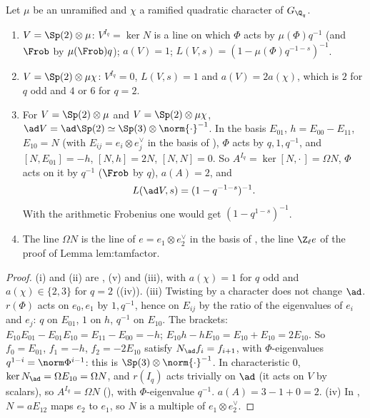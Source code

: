 \begin{proposition}\label{prop:local:steinberg-shape}
Let $\mu$ be an unramified and $\chi$ a ramified quadratic character of $G_{\Q_q}$.
\begin{enumerate}[label=(\roman*)]
\item $V=\Sp(2)\otimes\mu$: $V^{I_q}=\ker N$ is a line on which $\Phi$ acts by $\mu(\Phi)q^{-1}$ (and $\Frob$ by $\mu(\Frob)q$); $a(V)=1$; $L(V,s)=(1-\mu(\Phi)q^{-1-s})^{-1}$.
\item $V=\Sp(2)\otimes\mu\chi$: $V^{I_q}=0$, $L(V,s)=1$ and $a(V)=2a(\chi)$, which is $2$ for $q$ odd and $4$ or $6$ for $q=2$.
\item For $V=\Sp(2)\otimes\mu$ and $V=\Sp(2)\otimes\mu\chi$, $\ad V=\ad\Sp(2)\simeq\Sp(3)\otimes\norm{\cdot}^{-1}$. In the basis $E_{01}$, $h=E_{00}-E_{11}$, $E_{10}=N$ (with
$E_{ij}=e_i\otimes e_j^\vee$ in the basis of ), $\Phi$ acts by $q,1,q^{-1}$, and $[N,E_{01}]=-h$, $[N,h]=2N$, $[N,N]=0$. So $A^{I_q}=\ker[N,\cdot\,]=\Omega N$, $\Phi$ acts on it
by $q^{-1}$ ($\Frob$ by $q$), $a(A)=2$, and
\[
L(\ad V,s)=(1-q^{-1-s})^{-1}.
\]
With the arithmetic Frobenius one would get $(1-q^{1-s})^{-1}$.
\item The line $\Omega N$ is the line of $e=e_1\otimes e_2^\vee$ in the basis of , the line $\Z_\ell e$ of the proof of Lemma lem:tamfactor.
\end{enumerate}
\end{proposition}

\begin{proof}
(i) and (ii) are , (v) and (iii), with $a(\chi)=1$ for $q$ odd and $a(\chi)\in\{2,3\}$ for $q=2$
((iv)). (iii) Twisting by a character does not change $\ad$. $r(\Phi)$ acts on $e_0,e_1$ by $1,q^{-1}$, hence on $E_{ij}$ by the ratio of the eigenvalues
of $e_i$ and $e_j$: $q$ on $E_{01}$, $1$ on $h$, $q^{-1}$ on $E_{10}$. The brackets: $E_{10}E_{01}-E_{01}E_{10}=E_{11}-E_{00}=-h$; $E_{10}h-hE_{10}=E_{10}+E_{10}=2E_{10}$. So
$f_0=E_{01}$, $f_1=-h$, $f_2=-2E_{10}$ satisfy $N_{\ad}f_i=f_{i+1}$, with $\Phi$-eigenvalues $q^{1-i}=\norm\Phi^{i-1}$: this is $\Sp(3)\otimes\norm{\cdot}^{-1}$. In characteristic $0$,
$\ker N_{\ad}=\Omega E_{10}=\Omega N$, and $r(I_q)$ acts trivially on $\ad$ (it acts on $V$ by scalars), so $A^{I_q}=\Omega N$ (), with $\Phi$-eigenvalue $q^{-1}$.
$a(A)=3-1+0=2$. (iv) In , $N=aE_{12}$ maps $e_2$ to $e_1$, so $N$ is a multiple of $e_1\otimes e_2^\vee$.
\end{proof}

